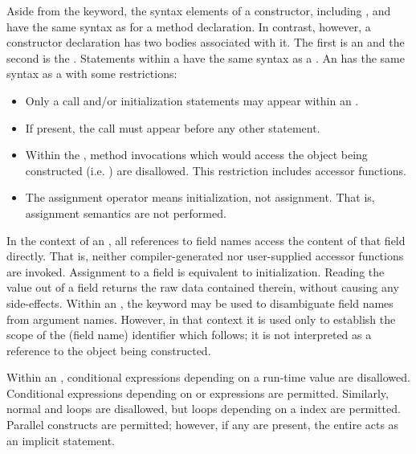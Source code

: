 Aside from the  keyword, the syntax elements of a constructor,
including ,  and 
have the same syntax as for a method declaration.  In contrast, however,
a constructor declaration has two bodies associated with it.  The first is
an  and the second is the .
Statements within a  have the same syntax as
a . An  has the same syntax as
a  with some restrictions:
\begin{itemize}
\item Only a  call and/or initialization statements
may appear within an .
\item If present, the  call must appear before any other statement.
\item Within the , method invocations which would
access the object being constructed (i.e. ) are disallowed.  This
restriction includes accessor functions.  
\item The assignment operator \chpl{=} means initialization, not assignment.
That is, assignment semantics are not performed.
\end{itemize}
\noindent
In the context of an
, all references to field names access the content
of that field directly.  That is, neither compiler-generated nor user-supplied
accessor functions are invoked.  Assignment to a field is equivalent to
initialization.  Reading the value out of a field returns the raw data contained
therein, without causing any side-effects.  Within
an , the  keyword may be used to
disambiguate field names from argument names.  However, in that context it is used
only to establish the scope of the (field name) identifier which follows; it is
not interpreted as a reference to the object being constructed.

Within an , conditional expressions depending on a
run-time value are disallowed.  Conditional expressions depending
on  or  expressions are permitted.  Similarly,
normal  and  loops are disallowed, but loops depending on
a  index are permitted.  Parallel constructs are permitted; however,
if any are present, the entire  acts as an implicit
 statement.

